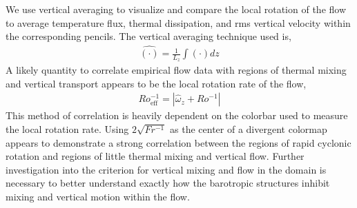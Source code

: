 \documentclass[30pt, blockverticalspace=1cm]{tikzposter}
\begin{document}
\begin{columns}
{    We use
    vertical averaging to visualize and compare the local rotation of the flow
    to average temperature flux, thermal dissipation, and rms vertical velocity
    within the corresponding pencils. The vertical averaging technique used is,
    \begin{gather*}
        \widehat{(\cdot)} = \frac{1}{L_z}\int (\cdot) dz
    \end{gather*}
    A likely quantity to
    correlate empirical flow data with regions of thermal mixing and vertical
    transport appears to be the local rotation rate of the flow, 
    \begin{gather*}
        Ro_{\text{eff}}^{-1} = |\widehat{\omega}_z + Ro^{-1}|
    \end{gather*}
    This method of correlation is heavily dependent on the colorbar used to
    measure the local rotation rate. Using $2\sqrt{Fr^{-1}}$ as the center of
    a divergent colormap appears to demonstrate a strong correlation between the
    regions of rapid cyclonic rotation and regions of little thermal mixing and
    vertical flow. Further investigation into the criterion for vertical mixing
    and flow in the domain is necessary to better understand exactly how the
    barotropic structures inhibit mixing and vertical motion within the flow. 

}
\end{columns}
\end{document}
